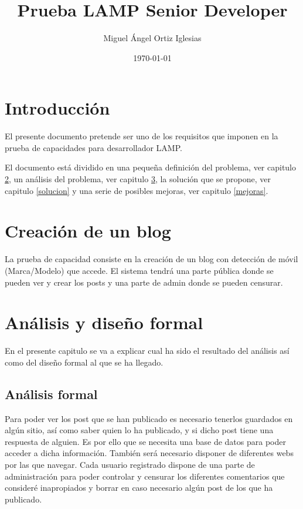 \documentclass[a4paper]{article}
\title{Prueba LAMP Senior Developer}
\author{Miguel Ángel Ortiz Iglesias}
\date{\today}
\begin{document}
	\maketitle
	\tableofcontents
	\section{Introducción}
	El presente documento pretende ser uno de los requisitos que imponen en la prueba de capacidades  para desarrollador LAMP.
	
	El documento está dividido en una pequeña definición del problema, ver capitulo \ref{definicion}, un análisis  del problema, ver capitulo \ref{analisis}, la solución que se propone, ver capitulo \ref{solucion} y una serie de posibles mejoras, ver capitulo \ref{mejoras}.
	\section{Creación de un blog}\label{definicion}
	La prueba de capacidad consiste en la creación de un blog con detección de móvil (Marca/Modelo) que accede. El sistema tendrá una parte pública donde se pueden ver y crear los posts y una parte de admin donde se pueden censurar.
	
	\section{Análisis y diseño formal}\label{analisis}
	En el presente capitulo se va a  explicar cual ha sido el resultado del análisis así como del diseño formal al que se ha llegado.
	\subsection{Análisis formal}
	Para poder ver los post que se han publicado es necesario tenerlos guardados en algún sitio, así como saber quien lo ha publicado, y si dicho post tiene una respuesta de alguien. Es por ello que se necesita una base de datos para poder acceder a dicha información.\newline
	También será necesario disponer de diferentes webs por las que navegar.\newline
	Cada usuario registrado dispone de una parte de administración para poder controlar y censurar los diferentes comentarios que consideré inapropiados y borrar en caso necesario algún post de los que ha publicado.
	
\end{document}
